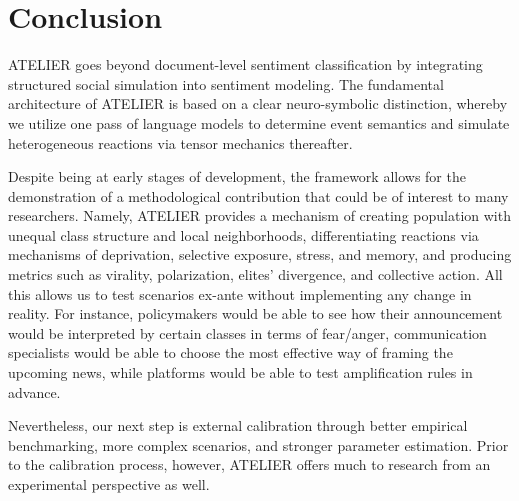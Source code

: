 \documentclass[12pt]{IEEEtran}
\begin{document}
\section{Conclusion}
\label{sec:conclusion}
ATELIER goes beyond document-level sentiment classification by integrating structured social simulation into sentiment modeling. The fundamental architecture of ATELIER is based on a clear neuro-symbolic distinction, whereby we utilize one pass of language models to determine event semantics and simulate heterogeneous reactions via tensor mechanics thereafter.

Despite being at early stages of development, the framework allows for the demonstration of a methodological contribution that could be of interest to many researchers. Namely, ATELIER provides a mechanism of creating population with unequal class structure and local neighborhoods, differentiating reactions via mechanisms of deprivation, selective exposure, stress, and memory, and producing metrics such as virality, polarization, elites' divergence, and collective action. All this allows us to test scenarios ex-ante without implementing any change in reality. For instance, policymakers would be able to see how their announcement would be interpreted by certain classes in terms of fear/anger, communication specialists would be able to choose the most effective way of framing the upcoming news, while platforms would be able to test amplification rules in advance.

Nevertheless, our next step is external calibration through better empirical benchmarking, more complex scenarios, and stronger parameter estimation. Prior to the calibration process, however, ATELIER offers much to research from an experimental perspective as well.
\end{document}
